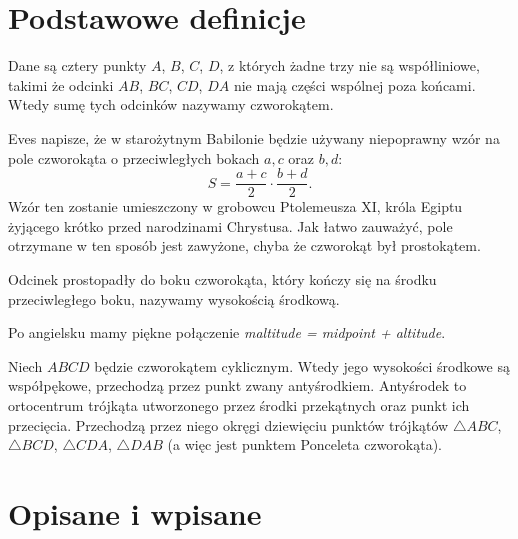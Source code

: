 %

\section{Podstawowe definicje}

\begin{definition}[czworokąt]
%
	Dane są cztery punkty $A$, $B$, $C$, $D$, z których żadne trzy nie są współliniowe, takimi że odcinki $AB$, $BC$, $CD$, $DA$ nie mają części wspólnej poza końcami.
    Wtedy sumę tych odcinków nazywamy czworokątem.	
\end{definition}



Eves \cite[s.4]{eves_1963} napisze, że w starożytnym Babilonie będzie używany niepoprawny wzór na pole czworokąta o przeciwległych bokach $a, c$ oraz $b, d$:
\begin{equation}
	S = \frac{a + c}{2} \cdot \frac{b + d}{2}.
\end{equation}
Wzór ten zostanie umieszczony w grobowcu Ptolemeusza XI, króla Egiptu żyjącego krótko przed narodzinami Chrystusa.
Jak łatwo zauważyć, pole otrzymane w ten sposób jest zawyżone, chyba że czworokąt był prostokątem.


\begin{definition}
	Odcinek prostopadły do boku czworokąta, który kończy się na środku przeciwległego boku, nazywamy wysokością środkową.
\end{definition}

Po angielsku mamy piękne połączenie \emph{maltitude = midpoint + altitude}.

\begin{proposition} %
	Niech $ABCD$ będzie czworokątem cyklicznym.
	Wtedy jego wysokości środkowe są współpękowe, przechodzą przez punkt zwany antyśrodkiem.
%
	Antyśrodek to ortocentrum trójkąta utworzonego przez środki przekątnych oraz punkt ich przecięcia.
	Przechodzą przez niego okręgi dziewięciu punktów trójkątów $\triangle ABC$, $\triangle BCD$, $\triangle CDA$, $\triangle DAB$ (a więc jest punktem Ponceleta czworokąta).
\end{proposition}

\section{Opisane i wpisane}


